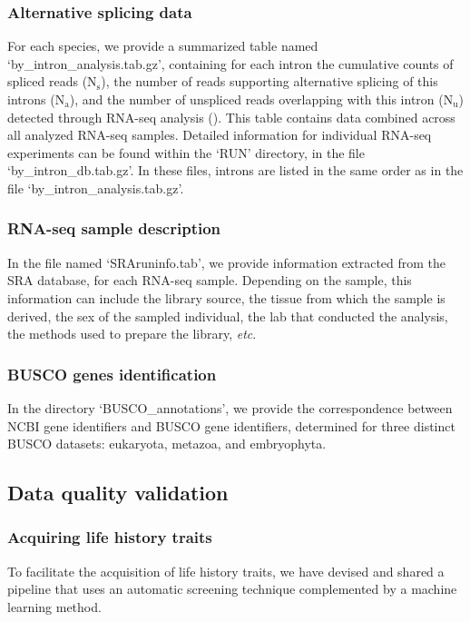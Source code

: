\subsubsection{Alternative splicing data}
For each species, we provide a summarized table named `by\_intron\_analysis.tab.gz', containing for each intron the cumulative counts of spliced reads ($\mathrm{N_s}$), the number of reads supporting alternative splicing of this introns ($\mathrm{N_a}$), and the number of unspliced reads overlapping with this intron ($\mathrm{N_u}$) detected through RNA-seq analysis (). This table contains data combined across all analyzed RNA-seq samples. Detailed information for individual RNA-seq experiments can be found within the `RUN' directory, in the file `by\_intron\_db.tab.gz'. In these files, introns are listed in the same order as in the file `by\_intron\_analysis.tab.gz'.

\subsubsection{RNA-seq sample description}
In the file named `SRAruninfo.tab', we provide information extracted from the SRA database, for each RNA-seq sample. Depending on the sample, this information can include the library source, the tissue from which the sample is derived, the sex of the sampled individual, the lab that conducted the analysis, the methods used to prepare the library, \textit{etc}.

\subsubsection{BUSCO genes identification}
In the directory `BUSCO\_annotations', we provide the correspondence between NCBI gene identifiers and \acrshort{BUSCO} gene identifiers, determined for three distinct \acrshort{BUSCO} datasets: eukaryota, metazoa, and embryophyta.

\subsection{Data quality validation}
\label{sec:TechnicalValidation}
\subsubsection{Acquiring life history traits}
To facilitate the acquisition of life history traits, we have devised and shared a pipeline that uses an automatic screening technique complemented by a machine learning method.

